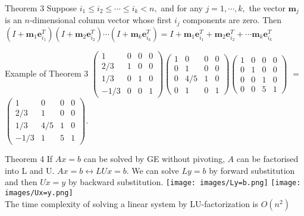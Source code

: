\documentclass[10pt,landscape]{article}
\theoremstyle{definition}
\newcommand{\thistheoremname}{}
\newtheorem*{genericthm*}{\thistheoremname}
\newenvironment{namedthm*}[1]
{\renewcommand{\thistheoremname}{#1}\begin{genericthm*}}
{\end{genericthm*}}
\begin{document}
\begin{multicols}{3}
\begin{namedthm*}{Theorem 3}
Suppose $i_{1} \leqslant i_{2} \leqslant \cdots \leqslant i_{k}<n,$ and for any $j=1, \cdots, k,$ the vector $\mathbf{m}_{j}$ is an $n$-dimensional column vector whose first $i_{j}$ components are zero. Then
$\left(I+\mathbf{m}_{1} \mathbf{e}_{i_{1}}^{T}\right)\left(I+\mathbf{m}_{2} \mathbf{e}_{i_{2}}^{T}\right) \cdots\left(I+\mathbf{m}_{k} \mathbf{e}_{i_{k}}^{T}\right)=I+\mathbf{m}_{1} \mathbf{e}_{i_{1}}^{T}+\mathbf{m}_{2} \mathbf{e}_{i_{2}}^{T}+\cdots \mathbf{m}_{k} \mathbf{e}_{i_{k}}^{T}$
\end{namedthm*}
\begin{namedthm*}{Example of Theorem 3}
$\left(\begin{array}{rrrrr}{1} & {0} & {0} & {0} \\ {2 / 3} & {1} & {0} & {0} \\ {1 / 3} & {0} & {1} & {0} \\ {-1 / 3} & {0} & {0} & {1}\end{array}\right)\left(\begin{array}{rrrr}{1} & {0} & {0} & {0} \\ {0} & {1} & {0} & {0} \\ {0} & {4 / 5} & {1} & {0} \\ {0} & {1} & {0} & {1}\end{array}\right)\left(\begin{array}{llll}{1} & {0} & {0} & {0} \\ {0} & {1} & {0} & {0} \\ {0} & {0} & {1} & {0} \\ {0} & {0} & {5} & {1}\end{array}\right)$ $=$  $\left(\begin{array}{rrrr}{1} & {0} & {0} & {0} \\ {2 / 3} & {1} & {0} & {0} \\ {1 / 3} & {4 / 5} & {1} & {0} \\ {-1 / 3} & {1} & {5} & {1}\end{array}\right)$.
\end{namedthm*}


\begin{namedthm*}{Theorem 4}
If $Ax=b$ can be solved by GE without pivoting, $A$ can be factorised into L and U. $Ax=b \leftrightarrow LUx=b$. We can solve $Ly=b$ by forward substitution and then $Ux=y$ by backward substitution.
\texttt{[image: images/Ly=b.png]}
\texttt{[image: images/Ux=y.png]}
\\The time complexity of solving a linear system by LU-factorization is $O(n^2)$
\end{namedthm*}


\end{multicols}
\end{document}
